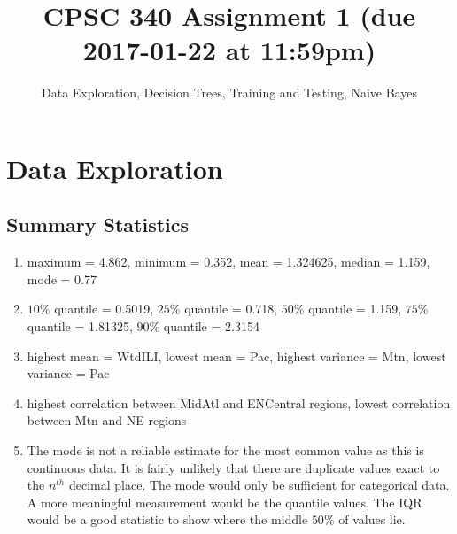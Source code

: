 \documentclass{article}
\begin{document}
\title{CPSC 340 Assignment 1 (due 2017-01-22 at 11:59pm)}
\author{Data Exploration, Decision Trees, Training and Testing, Naive Bayes}
\date{}
\maketitle
\section{Data Exploration}
\subsection{Summary Statistics}
\begin{enumerate}
\item maximum = 4.862, minimum = 0.352, mean = 1.324625, median = 1.159, mode = 0.77
\item $10\%$ quantile = 0.5019, $25\%$ quantile = 0.718, $50\%$ quantile = 1.159, $75\%$ quantile = 1.81325, $90\%$ quantile = 2.3154
\item highest mean = WtdILI, lowest mean = Pac, highest variance = Mtn, lowest variance = Pac
\item highest correlation between MidAtl and ENCentral regions, lowest correlation between Mtn and NE regions
\item The  mode is not a reliable estimate for the most common value as this is continuous data. It is fairly unlikely that there are duplicate values exact to the $n^{th}$ decimal place. The mode would only be sufficient for categorical data. A more meaningful measurement would be the quantile values. The IQR would  be a good statistic to show where the middle $50\%$ of values lie.
\end{enumerate}
\end{document}
